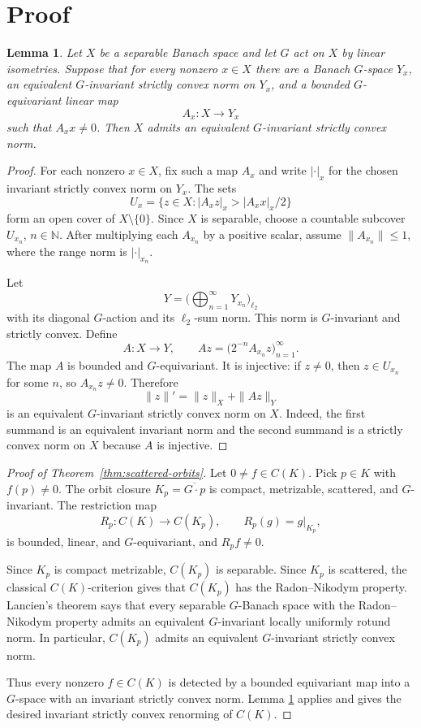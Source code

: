 \documentclass[11pt]{article}
\newtheorem{lemma}{Lemma}
\newcommand{\N}{\mathbb N}
\begin{document}
\section*{Proof}

\begin{lemma}\label{lem:separating-family}
Let \(X\) be a separable Banach space and let \(G\) act on \(X\) by linear
isometries.  Suppose that for every nonzero \(x\in X\) there are a Banach
\(G\)-space \(Y_x\), an equivalent \(G\)-invariant strictly convex norm on
\(Y_x\), and a bounded \(G\)-equivariant linear map
\[
A_x:X\to Y_x
\]
such that \(A_xx\neq 0\).  Then \(X\) admits an equivalent \(G\)-invariant
strictly convex norm.
\end{lemma}

\begin{proof}
For each nonzero \(x\in X\), fix such a map \(A_x\) and write
\(|\cdot|_x\) for the chosen invariant strictly convex norm on \(Y_x\).
The sets
\[
U_x=\{z\in X: |A_xz|_x> |A_xx|_x/2\}
\]
form an open cover of \(X\setminus\{0\}\).  Since \(X\) is separable, choose a
countable subcover \(U_{x_n}\), \(n\in\N\).  After multiplying each \(A_{x_n}\)
by a positive scalar, assume \(\|A_{x_n}\|\leq 1\), where the range norm is
\(|\cdot|_{x_n}\).

Let
\[
Y=\Big(\bigoplus_{n=1}^{\infty} Y_{x_n}\Big)_{\ell_2}
\]
with its diagonal \(G\)-action and its \(\ell_2\)-sum norm.  This norm is
\(G\)-invariant and strictly convex.  Define
\[
A:X\to Y,\qquad
A z=\big(2^{-n}A_{x_n}z\big)_{n=1}^{\infty}.
\]
The map \(A\) is bounded and \(G\)-equivariant.  It is injective: if
\(z\neq0\), then \(z\in U_{x_n}\) for some \(n\), so \(A_{x_n}z\neq0\).
Therefore
\[
\|z\|'=\|z\|_X+\|Az\|_Y
\]
is an equivalent \(G\)-invariant strictly convex norm on \(X\).  Indeed, the
first summand is an equivalent invariant norm and the second summand is a
strictly convex norm on \(X\) because \(A\) is injective.
\end{proof}

\begin{proof}[Proof of Theorem~\ref{thm:scattered-orbits}]
Let \(0\neq f\in C(K)\).  Pick \(p\in K\) with \(f(p)\neq0\).  The orbit
closure \(K_p=\overline{G\cdot p}\) is compact, metrizable, scattered, and
\(G\)-invariant.  The restriction map
\[
R_p:C(K)\to C(K_p),\qquad R_p(g)=g|_{K_p},
\]
is bounded, linear, and \(G\)-equivariant, and \(R_pf\neq0\).

Since \(K_p\) is compact metrizable, \(C(K_p)\) is separable.  Since \(K_p\) is
scattered, the classical \(C(K)\)-criterion gives that \(C(K_p)\) has the
Radon--Nikodym property.  Lancien's theorem says that every separable
\(G\)-Banach space with the Radon--Nikodym property admits an equivalent
\(G\)-invariant locally uniformly rotund norm.  In particular, \(C(K_p)\)
admits an equivalent \(G\)-invariant strictly convex norm.

Thus every nonzero \(f\in C(K)\) is detected by a bounded equivariant map into
a \(G\)-space with an invariant strictly convex norm.  Lemma
\ref{lem:separating-family} applies and gives the desired invariant strictly
convex renorming of \(C(K)\).
\end{proof}
\end{document}
